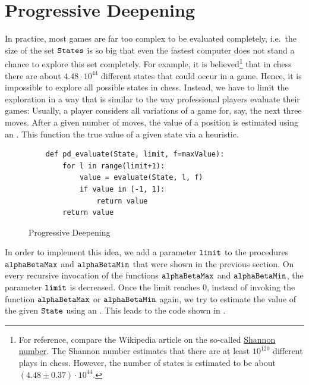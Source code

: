 \section{Progressive Deepening}
In practice, most games are far too complex to be evaluated completely, i.e.~the size of the set
$\texttt{States}$ is so big that even the fastest computer does not stand a chance to explore this set
completely.  For example, it is believed\footnote{
  For reference, compare the Wikipedia article on the so-called
  \href{https://en.wikipedia.org/wiki/Shannon_number}{Shannon number}.
  The Shannon number estimates that there are at least $10^{120}$ different plays in chess.  However, the
  number of states is estimated to be about $(4.48\pm 0.37) \cdot 10^{44}$. 
}
that in chess there are about $4.48 \cdot 10^{44}$ different states that could occur in a game.
Hence, it is impossible to explore all possible states in chess.  Instead, we have to limit
the exploration in a way that is similar to the way professional players evaluate their games:  Usually, a
player considers all variations of a game for, say, the next three moves.  After a given number of moves, the
value of a position is estimated using an .  This function  the true
value of a given state via a heuristic.

\begin{figure}[!ht]
\centering
\begin{verbatim}
    def pd_evaluate(State, limit, f=maxValue):
        for l in range(limit+1):
            value = evaluate(State, l, f)
            if value in [-1, 1]:
                return value
        return value
\end{verbatim}
\caption{Progressive Deepening}
\label{fig:Game.ipynb:pd_evaluate}
\end{figure}
\FloatBarrier


In order to implement this idea, we add a parameter $\texttt{limit}$ to the procedures $\texttt{alphaBetaMax}$
and $\texttt{alphaBetaMin}$ that were shown in the previous section.  On
every recursive invocation of the functions $\texttt{alphaBetaMax}$ and $\texttt{alphaBetaMin}$, the parameter
$\texttt{limit}$ is decreased. 
Once the limit reaches $0$, instead of invoking the function $\texttt{alphaBetaMax}$ or $\texttt{alphaBetaMin}$
again, we try to estimate the value of the given $\texttt{State}$ using an .  This
leads to the code shown in . 

